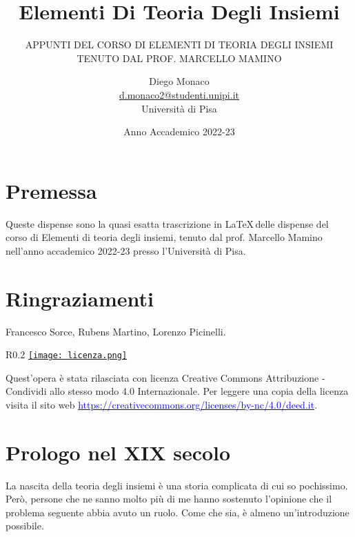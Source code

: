 \documentclass[11pt]{scrartcl}
\begin{document}
\title{Elementi Di Teoria Degli Insiemi}
\subtitle{\large\normalfont\rmfamily\scshape APPUNTI DEL CORSO DI ELEMENTI DI TEORIA DEGLI INSIEMI \\ TENUTO DAL PROF. MARCELLO MAMINO}
\author{Diego Monaco \\ \textnormal{\href{d.monaco2@studenti.unipi.it}{d.monaco2@studenti.unipi.it}} \\ Università di Pisa}
\date{Anno Accademico 2022-23}
\maketitle
\newpage

\tableofcontents
\eject
\newpage

\section*{Premessa}
Queste dispense sono la quasi esatta trascrizione in \LaTeX\,delle dispense del corso di Elementi di teoria degli insiemi, tenuto dal prof. Marcello Mamino nell'anno accademico 2022-23 presso l'Università di Pisa.

\section*{Ringraziamenti}
Francesco Sorce, Rubens Martino, Lorenzo Picinelli.

\mbox{}
\vfill
\begin{wrapfigure}{R}{0.2\textwidth}
	\centering
	\href{https://creativecommons.org/licenses/by-nc/4.0/deed.it}{\texttt{[image: licenza.png]}}
\end{wrapfigure}

Quest'opera è stata rilasciata con licenza Creative Commons Attribuzione - Condividi allo stesso modo 4.0 Internazionale. Per leggere
una copia della licenza visita il sito web \href{http://creativecommons.org/licenses/by-sa/4.0/deed.it}{\textcolor{blue}{https://creativecommons.org/licenses/by-nc/4.0/deed.it}}.\\

\newpage
\section{Prologo nel XIX secolo}
La nascita della teoria degli insiemi è una storia complicata di cui so pochissimo. Però, persone che ne sanno molto più di me hanno sostenuto l'opinione che il problema seguente
abbia avuto un ruolo. Come che sia, è almeno un'introduzione possibile.
\end{document}
